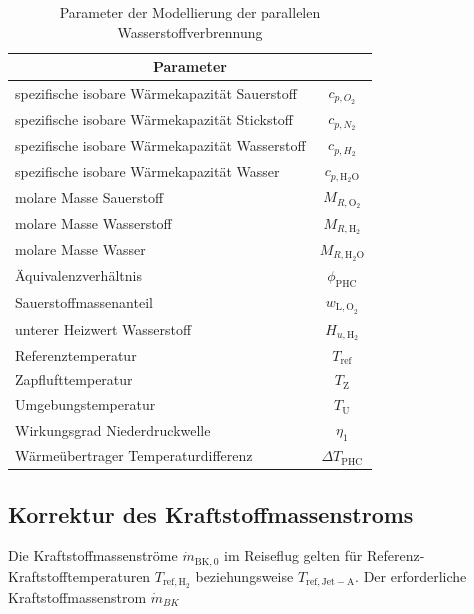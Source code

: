 \begin{table}[ht]
    \centering
	\caption{Parameter der Modellierung der parallelen Wasserstoffverbrennung}
	\begin{tabular} {|l|c|} \hline%
    \multicolumn{2}{|c|}{Parameter} \\ \hline\hline
    spezifische isobare Wärmekapazität Sauerstoff & $c_{p, O_2}$ \\ \hline
    spezifische isobare Wärmekapazität Stickstoff & $c_{p, N_2}$ \\ \hline
    spezifische isobare Wärmekapazität Wasserstoff & $c_{p, H_2}$ \\ \hline
    spezifische isobare Wärmekapazität Wasser & $c_{p, \mathrm{H}_2\mathrm{O}}$ \\ \hline
    molare Masse Sauerstoff & $M_{R, \mathrm{O}_2}$ \\ \hline
    molare Masse Wasserstoff & $M_{R, \mathrm{H}_2}$ \\ \hline
    molare Masse Wasser & $M_{R, \mathrm{H}_2\mathrm{O}}$ \\ \hline
    Äquivalenzverhältnis & $\phi_{\mathrm{PHC}}$ \\ \hline
    Sauerstoffmassenanteil & $w_{\mathrm{L,O}_2}$ \\ \hline
    unterer Heizwert Wasserstoff & $H_{u, \mathrm{H}_2}$ \\ \hline
    Referenztemperatur & $T_{\mathrm{ref}}$ \\ \hline
    Zapflufttemperatur & $T_\mathrm{Z}$ \\ \hline
    Umgebungstemperatur & $T_\mathrm{U}$ \\ \hline
    Wirkungsgrad Niederdruckwelle & $\eta_1$ \\ \hline
    Wärmeübertrager Temperaturdifferenz & $\Delta T_{\mathrm{PHC}}$ \\ \hline  
    
	\end{tabular}	
    \label{Tab:phc_params}%
\end{table}
\FloatBarrier 

\subsection{Korrektur des Kraftstoffmassenstroms}

Die Kraftstoffmassenströme $\dot{m}_{\mathrm{BK},0}$ im Reiseflug gelten für Referenz-Kraftstofftemperaturen $T_{\mathrm{ref,H_2}}$ beziehungsweise $T_{\mathrm{ref, Jet-A}}$. Der erforderliche Kraftstoffmassenstrom $\dot{m}_{BK}$

